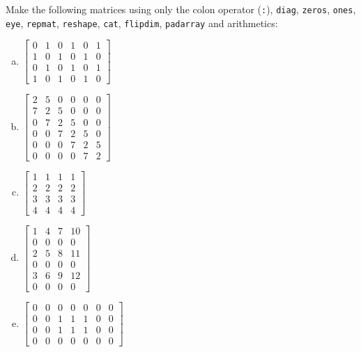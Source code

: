 \documentclass[a4paper, fleqn, 10pt]{report}
\theoremstyle{definition}
\newenvironment{prb*}[1]
  {\renewcommand\theprb{\thechapter.\arabic{prb}\rlap{$^{#1}$}}\prb}
  {\endprb}
\newcommand{\mc}[1]{{\color{Blue}\tt #1}}
\begin{document}
\begin{prb*}{2}
Make the following matrices using only the colon operator (\mc{:}), \mc{diag}, \mc{zeros},
\mc{ones}, \mc{eye}, \mc{repmat}, \mc{reshape}, \mc{cat}, \mc{flipdim}, \mc{padarray} and arithmetics:
\begin{multicols}{3}
\begin{enumerate}[a)]
\item $\displaystyle
\begin{bmatrix}
0 & 1 & 0 & 1 & 0 & 1\\
1 & 0 & 1 & 0 & 1 & 0\\
0 & 1 & 0 & 1 & 0 & 1\\
1 & 0 & 1 & 0 & 1 & 0
\end{bmatrix}
$
\item $\displaystyle
\begin{bmatrix}
2 & 5 & 0 & 0 & 0 & 0\\
7 & 2 & 5 & 0 & 0 & 0\\
0 & 7 & 2 & 5 & 0 & 0\\
0 & 0 & 7 & 2 & 5 & 0\\
0 & 0 & 0 & 7 & 2 & 5\\
0 & 0 & 0 & 0 & 7 & 2
\end{bmatrix}
$

\item $\displaystyle
\begin{bmatrix}
1 & 1 & 1 & 1\\
2 & 2 & 2 & 2\\
3 & 3 & 3 & 3\\
4 & 4 & 4 & 4
\end{bmatrix}
$

\item $\displaystyle
\begin{bmatrix}
1 & 4 & 7 & 10\\
0 & 0 & 0 & 0\\
2 & 5 & 8 & 11\\
0 & 0 & 0 & 0\\
3 & 6 & 9 & 12\\
0 & 0 & 0 & 0
\end{bmatrix}
$

\item $\displaystyle
\begin{bmatrix}
0 & 0 & 0 & 0 & 0 & 0 & 0\\
0 & 0 & 1 & 1 & 1 & 0 & 0\\
0 & 0 & 1 & 1 & 1 & 0 & 0\\
0 & 0 & 0 & 0 & 0 & 0 & 0
\end{bmatrix}
$


\end{enumerate}
\end{multicols}
\end{prb*}
\end{document}
